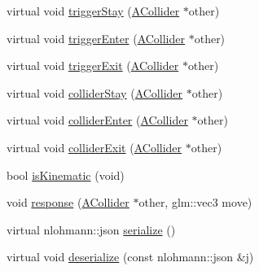 \begin{DoxyCompactItemize}
\item 
virtual void \mbox{\hyperlink{class_beer_engine_1_1_component_1_1_a_collider_a789bd29ac268dce4e8c62158fe0fa6f2}{trigger\+Stay}} (\mbox{\hyperlink{class_beer_engine_1_1_component_1_1_a_collider}{A\+Collider}} $\ast$other)
\item 
virtual void \mbox{\hyperlink{class_beer_engine_1_1_component_1_1_a_collider_a9ae412a0e4650848a0ce539aa05b1c6a}{trigger\+Enter}} (\mbox{\hyperlink{class_beer_engine_1_1_component_1_1_a_collider}{A\+Collider}} $\ast$other)
\item 
virtual void \mbox{\hyperlink{class_beer_engine_1_1_component_1_1_a_collider_aef3fe6dd09a0959ab496f2eaaa5d0491}{trigger\+Exit}} (\mbox{\hyperlink{class_beer_engine_1_1_component_1_1_a_collider}{A\+Collider}} $\ast$other)
\item 
virtual void \mbox{\hyperlink{class_beer_engine_1_1_component_1_1_a_collider_a6407be22d828a4515dd16bb3c552f36d}{collider\+Stay}} (\mbox{\hyperlink{class_beer_engine_1_1_component_1_1_a_collider}{A\+Collider}} $\ast$other)
\item 
virtual void \mbox{\hyperlink{class_beer_engine_1_1_component_1_1_a_collider_afa37b41af82346916f1f4f6d0956d2c0}{collider\+Enter}} (\mbox{\hyperlink{class_beer_engine_1_1_component_1_1_a_collider}{A\+Collider}} $\ast$other)
\item 
virtual void \mbox{\hyperlink{class_beer_engine_1_1_component_1_1_a_collider_a6446f7f796c3a7f619c7c1ef774502b7}{collider\+Exit}} (\mbox{\hyperlink{class_beer_engine_1_1_component_1_1_a_collider}{A\+Collider}} $\ast$other)
\item 
bool \mbox{\hyperlink{class_beer_engine_1_1_component_1_1_a_collider_aee0827674c1f742a1a5ee119f692d7a2}{is\+Kinematic}} (void)
\item 
void \mbox{\hyperlink{class_beer_engine_1_1_component_1_1_a_collider_ac0882500e46a05bb646b23394407c769}{response}} (\mbox{\hyperlink{class_beer_engine_1_1_component_1_1_a_collider}{A\+Collider}} $\ast$other, glm\+::vec3 move)
\item 
virtual nlohmann\+::json \mbox{\hyperlink{class_beer_engine_1_1_component_1_1_a_collider_aecc5eb364d52beede07428ba1b668e09}{serialize}} ()
\item 
virtual void \mbox{\hyperlink{class_beer_engine_1_1_component_1_1_a_collider_ac6bad21e0cfe7f95c431b9a7a59c550c}{deserialize}} (const nlohmann\+::json \&j)
\end{DoxyCompactItemize}
